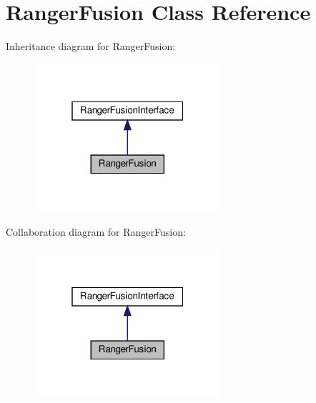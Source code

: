 \hypertarget{classRangerFusion}{}\section{Ranger\+Fusion Class Reference}
\label{classRangerFusion}


Inheritance diagram for Ranger\+Fusion\+:\nopagebreak
\begin{figure}[H]
\begin{center}
\leavevmode
\includegraphics[width=196pt]{classRangerFusion__inherit__graph}
\end{center}
\end{figure}


Collaboration diagram for Ranger\+Fusion\+:\nopagebreak
\begin{figure}[H]
\begin{center}
\leavevmode
\includegraphics[width=196pt]{classRangerFusion__coll__graph}
\end{center}
\end{figure}
